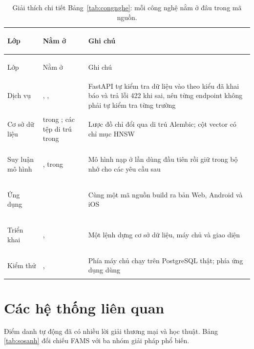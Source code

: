 {\small
\begin{xltabular}{\textwidth}{@{}>{\bfseries\raggedright\arraybackslash\leavevmode}p{2.6cm} >{\raggedright\arraybackslash\leavevmode}p{5.6cm} >{\raggedright\arraybackslash\leavevmode}X@{}}
\caption{Giải thích chi tiết Bảng~\ref{tab:congnghe}: mỗi công nghệ nằm ở đâu trong mã nguồn.}
\label{tab:congnghe-gt}\\
\toprule
Lớp & Nằm ở & Ghi chú \\
\midrule
\endfirsthead
\toprule
Lớp & Nằm ở & Ghi chú \\
\midrule
\endhead
\bottomrule
\endfoot
Dịch vụ & , ,  & FastAPI tự kiểm tra dữ liệu vào theo kiểu đã khai báo và trả lỗi 422 khi sai, nên từng endpoint không phải tự kiểm tra từng trường \\
Cơ sở dữ liệu &  trong ; các tệp di trú trong  & Lược đồ chỉ đổi qua di trú Alembic; cột vector có chỉ mục HNSW \\
Suy luận mô hình & ,  trong  & Mô hình nạp ở lần dùng đầu tiên rồi giữ trong bộ nhớ cho các yêu cầu sau \\
Ứng dụng &  & Cùng một mã nguồn build ra bản Web, Android và iOS \\
Triển khai & ,  & Một lệnh dựng cơ sở dữ liệu, máy chủ và giao diện \\
Kiểm thử & ,  & Phía máy chủ chạy trên PostgreSQL thật; phía ứng dụng dùng  \\
\end{xltabular}}

\section{Các hệ thống liên quan}

Điểm danh tự động đã có nhiều lời giải thương mại và học thuật. Bảng
\ref{tab:sosanh} đối chiếu FAMS với ba nhóm giải pháp phổ biến.

